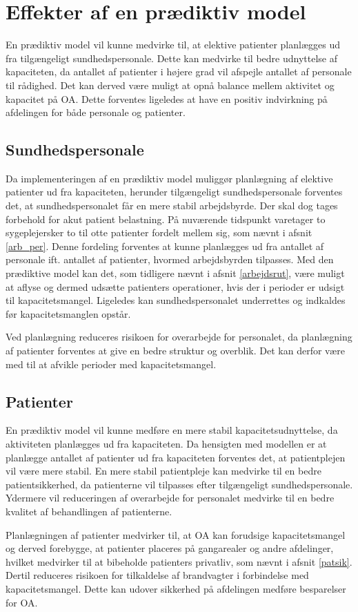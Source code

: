 \section{Effekter af en prædiktiv model}
En prædiktiv model vil kunne medvirke til, at elektive patienter planlægges ud fra tilgængeligt sundhedspersonale. Dette kan medvirke til bedre udnyttelse af kapaciteten, da antallet af patienter i højere grad vil afspejle antallet af personale til rådighed. Det kan derved være muligt at opnå balance mellem aktivitet og kapacitet på OA. Dette forventes ligeledes at have en positiv indvirkning på afdelingen for både personale og patienter. 


\subsection{Sundhedspersonale} \label{sundper}
Da implementeringen af en prædiktiv model muliggør planlægning af elektive patienter ud fra kapaciteten, herunder tilgængeligt sundhedspersonale forventes det, at sundhedspersonalet får en mere stabil arbejdsbyrde. Der skal dog tages forbehold for akut patient belastning. På nuværende tidspunkt varetager to sygeplejersker to til otte patienter fordelt mellem sig, som nævnt i afsnit \ref{arb_per}. Denne fordeling forventes at kunne planlægges ud fra antallet af personale ift. antallet af patienter, hvormed arbejdsbyrden tilpasses. Med den prædiktive model kan det, som tidligere nævnt i afsnit \ref{arbejdsrut}, være muligt at aflyse og dermed udsætte patienters operationer, hvis der i perioder er udsigt til kapacitetsmangel. Ligeledes kan sundhedspersonalet underrettes og indkaldes før kapacitetsmanglen opstår.


Ved planlægning reduceres risikoen for overarbejde for personalet, da planlægning af patienter forventes at give en bedre struktur og overblik. Det kan derfor være med til at afvikle perioder med kapacitetsmangel.


\subsection{Patienter}
En prædiktiv model vil kunne medføre en mere stabil kapacitetsudnyttelse, da aktiviteten planlægges ud fra kapaciteten. Da hensigten med modellen er at planlægge antallet af patienter ud fra kapaciteten forventes det, at patientplejen vil være mere stabil. En mere stabil patientpleje kan medvirke til en bedre patientsikkerhed, da patienterne vil tilpasses efter tilgængeligt sundhedspersonale. Ydermere vil reduceringen af overarbejde for personalet medvirke til en bedre kvalitet af behandlingen af patienterne. 


Planlægningen af patienter medvirker til, at OA kan forudsige kapacitetsmangel og derved forebygge, at patienter placeres på gangarealer og andre afdelinger, hvilket medvirker til at bibeholde patienters privatliv, som nævnt i afsnit \ref{patsik}. Dertil reduceres risikoen for tilkaldelse af brandvagter i forbindelse med kapacitetsmangel. Dette kan udover sikkerhed på afdelingen medføre besparelser for OA. 









